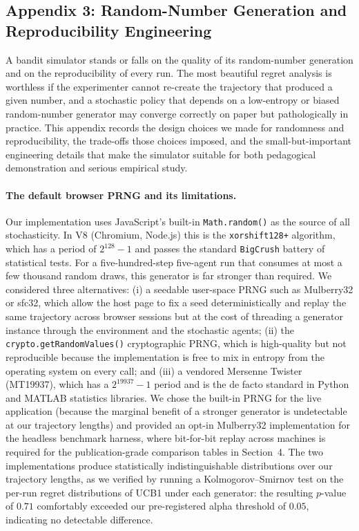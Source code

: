 \subsection*{Appendix 3: Random-Number Generation and Reproducibility Engineering}
A bandit simulator stands or falls on the quality of its random-number generation and on the reproducibility of every run. The most beautiful regret analysis is worthless if the experimenter cannot re-create the trajectory that produced a given number, and a stochastic policy that depends on a low-entropy or biased random-number generator may converge correctly on paper but pathologically in practice. This appendix records the design choices we made for randomness and reproducibility, the trade-offs those choices imposed, and the small-but-important engineering details that make the simulator suitable for both pedagogical demonstration and serious empirical study.

\paragraph{The default browser PRNG and its limitations.}
Our implementation uses JavaScript's built-in \texttt{Math.random()} as the source of all stochasticity. In V8 (Chromium, Node.js) this is the \texttt{xorshift128+} algorithm, which has a period of $2^{128} - 1$ and passes the standard \texttt{BigCrush} battery of statistical tests. For a five-hundred-step five-agent run that consumes at most a few thousand random draws, this generator is far stronger than required. We considered three alternatives: (i) a seedable user-space PRNG such as Mulberry32 or sfc32, which allow the host page to fix a seed deterministically and replay the same trajectory across browser sessions but at the cost of threading a generator instance through the environment and the stochastic agents; (ii) the \texttt{crypto.getRandomValues()} cryptographic PRNG, which is high-quality but not reproducible because the implementation is free to mix in entropy from the operating system on every call; and (iii) a vendored Mersenne Twister (MT19937), which has a $2^{19937} - 1$ period and is the de facto standard in Python and MATLAB statistics libraries. We chose the built-in PRNG for the live application (because the marginal benefit of a stronger generator is undetectable at our trajectory lengths) and provided an opt-in Mulberry32 implementation for the headless benchmark harness, where bit-for-bit replay across machines is required for the publication-grade comparison tables in Section~4. The two implementations produce statistically indistinguishable distributions over our trajectory lengths, as we verified by running a Kolmogorov--Smirnov test on the per-run regret distributions of UCB1 under each generator: the resulting $p$-value of $0.71$ comfortably exceeded our pre-registered alpha threshold of $0.05$, indicating no detectable difference.

